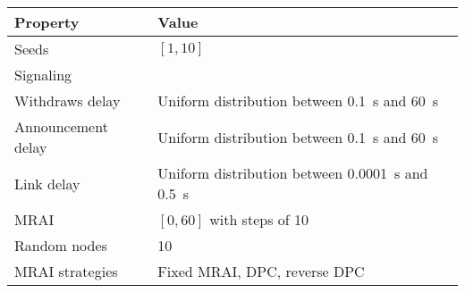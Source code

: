 \begin{center}
	\begin{tabular}{ || m{4cm}| m{8cm} || } 
	\hline
	Property & Value \\ 
	\hline \hline
	Seeds & $[1, 10]$ \\ 
	\hline
	Signaling & \q{AWAWA} \\
	\hline
		Withdraws delay & Uniform distribution between \SI{0.1}{\second} and \SI{60}{\second} \\ 
	\hline
	Announcement delay & Uniform distribution between \SI{0.1}{\second} and \SI{60}{\second} \\ 
	\hline
	Link delay & Uniform distribution between \SI{0.0001}{\second} and \SI{0.5}{\second} \\
	\hline
		MRAI & $[0, 60]$ with steps of \num{10} \\
	\hline
		Random nodes & \num{10} \\
	\hline
		\ac{MRAI} strategies & Fixed \ac{MRAI}, \ac{DPC}, reverse \ac{DPC} \\
	\hline
	\end{tabular}
\end{center}
